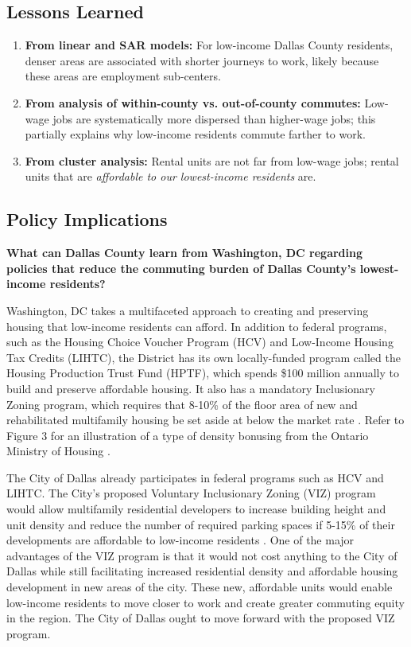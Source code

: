 \documentclass[paper=letter, fontsize=12pt]{scrartcl} %
\begin{document}
\subsection{Lessons Learned}
\begin{enumerate}
	\item \textbf{From linear and SAR models:} For low-income Dallas County residents, denser areas are associated with shorter journeys to work, likely because these areas are employment sub-centers.
	\item \textbf{From analysis of within-county vs. out-of-county commutes:} Low-wage jobs are systematically more dispersed than higher-wage jobs; this partially explains why low-income residents commute farther to work.
	\item \textbf{From cluster analysis:} Rental units are not far from low-wage jobs; rental units that are \textit{affordable to our lowest-income residents} are.
\end{enumerate}

\subsection{Policy Implications}
\textbf{What can Dallas County learn from Washington, DC regarding policies that reduce the commuting burden of Dallas County's lowest-income residents?}\par
Washington, DC takes a multifaceted approach to creating and preserving housing that low-income residents can afford. In addition to federal programs, such as the Housing Choice Voucher Program (HCV) and Low-Income Housing Tax Credits (LIHTC), the District has its own locally-funded program called the Housing Production Trust Fund (HPTF), which spends \$100 million annually to build and preserve affordable housing. It also has a mandatory Inclusionary Zoning program, which requires that 8-10\% of the floor area of new and rehabilitated multifamily housing be set aside at below the market rate \cite{dhcd} \cite{zippel1}. Refer to Figure 3 for an illustration of a type of density bonusing from the Ontario Ministry of Housing \cite{diagram}.\par

The City of Dallas already participates in federal programs such as HCV and LIHTC. The City's proposed Voluntary Inclusionary Zoning (VIZ) program would allow multifamily residential developers to increase building height and unit density and reduce the number of required parking spaces if 5-15\% of their developments are affordable to low-income residents \cite{thompson}. One of the major advantages of the VIZ program is that it would not cost anything to the City of Dallas while still facilitating increased residential density and affordable housing development in new areas of the city. These new, affordable units would enable low-income residents to move closer to work and create greater commuting equity in the region. The City of Dallas ought to move forward with the proposed VIZ program.\par
\end{document}
